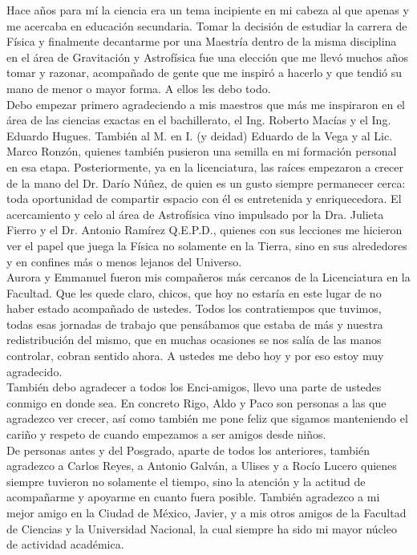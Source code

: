 \documentclass[letterpaper, twoside,openright]{book}
\begin{document}
Hace años para mí la ciencia era un tema incipiente en mi cabeza al que apenas y me acercaba en educación secundaria. Tomar la decisión de estudiar la carrera de Física y finalmente decantarme por una Maestría dentro de la misma disciplina en el área de Gravitación y Astrofísica fue una elección que me llevó muchos años tomar y razonar, acompañado de gente que me inspiró a hacerlo y que tendió su mano de menor o mayor forma. A ellos les debo todo.\\

Debo empezar primero agradeciendo a mis maestros que más me inspiraron en el área de las ciencias exactas en el bachillerato, el Ing. Roberto Macías y el Ing. Eduardo Hugues. También al M. en I. (y deidad) Eduardo de la Vega y al Lic. Marco Ronzón, quienes también pusieron una semilla en mi formación personal en esa etapa. Posteriormente, ya en la licenciatura, las raíces empezaron a crecer de la mano del Dr. Darío Núñez, de quien es un gusto siempre permanecer cerca: toda oportunidad de compartir espacio con él es entretenida y enriquecedora. El acercamiento y celo al área de Astrofísica vino impulsado por la Dra. Julieta Fierro y el Dr. Antonio Ramírez Q.E.P.D., quienes con sus lecciones me hicieron ver el papel que juega la Física no solamente en la Tierra, sino en sus alrededores y en confines más o menos lejanos del Universo.\\

Aurora y Emmanuel fueron mis compañeros más cercanos de la Licenciatura en la Facultad. Que les quede claro, chicos, que hoy no estaría en este lugar de no haber estado acompañado de ustedes. Todos los contratiempos que tuvimos, todas esas jornadas de trabajo que pensábamos que estaba de más y nuestra redistribución del mismo, que en muchas ocasiones se nos salía de las manos controlar, cobran sentido ahora. A ustedes me debo hoy y por eso estoy muy agradecido.\\

También debo agradecer a todos los Enci-amigos, llevo una parte de ustedes conmigo en donde sea. En concreto Rigo, Aldo y Paco son personas a las que agradezco ver crecer, así como también me pone feliz que sigamos manteniendo el cariño y respeto de cuando empezamos a ser amigos desde niños.\\

De personas antes y del Posgrado, aparte de todos los anteriores, también agradezco a Carlos Reyes, a Antonio Galván, a Ulises y a Rocío Lucero quienes siempre tuvieron no solamente el tiempo, sino la atención y la actitud de acompañarme y apoyarme en cuanto fuera posible. También agradezco a mi mejor amigo en la Ciudad de México, Javier, y a mis otros amigos de la Facultad de Ciencias y la Universidad Nacional, la cual siempre ha sido mi mayor núcleo de actividad académica.\\
\end{document}
